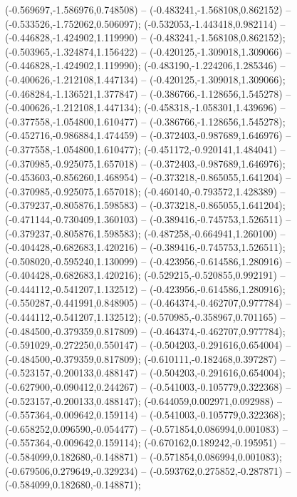  (-0.569697,-1.586976,0.748508) -- (-0.483241,-1.568108,0.862152) -- (-0.533526,-1.752062,0.506097);
 (-0.532053,-1.443418,0.982114) -- (-0.446828,-1.424902,1.119990) -- (-0.483241,-1.568108,0.862152);
 (-0.503965,-1.324874,1.156422) -- (-0.420125,-1.309018,1.309066) -- (-0.446828,-1.424902,1.119990);
 (-0.483190,-1.224206,1.285346) -- (-0.400626,-1.212108,1.447134) -- (-0.420125,-1.309018,1.309066);
 (-0.468284,-1.136521,1.377847) -- (-0.386766,-1.128656,1.545278) -- (-0.400626,-1.212108,1.447134);
 (-0.458318,-1.058301,1.439696) -- (-0.377558,-1.054800,1.610477) -- (-0.386766,-1.128656,1.545278);
 (-0.452716,-0.986884,1.474459) -- (-0.372403,-0.987689,1.646976) -- (-0.377558,-1.054800,1.610477);
 (-0.451172,-0.920141,1.484041) -- (-0.370985,-0.925075,1.657018) -- (-0.372403,-0.987689,1.646976);
 (-0.453603,-0.856260,1.468954) -- (-0.373218,-0.865055,1.641204) -- (-0.370985,-0.925075,1.657018);
 (-0.460140,-0.793572,1.428389) -- (-0.379237,-0.805876,1.598583) -- (-0.373218,-0.865055,1.641204);
 (-0.471144,-0.730409,1.360103) -- (-0.389416,-0.745753,1.526511) -- (-0.379237,-0.805876,1.598583);
 (-0.487258,-0.664941,1.260100) -- (-0.404428,-0.682683,1.420216) -- (-0.389416,-0.745753,1.526511);
 (-0.508020,-0.595240,1.130099) -- (-0.423956,-0.614586,1.280916) -- (-0.404428,-0.682683,1.420216);
 (-0.529215,-0.520855,0.992191) -- (-0.444112,-0.541207,1.132512) -- (-0.423956,-0.614586,1.280916);
 (-0.550287,-0.441991,0.848905) -- (-0.464374,-0.462707,0.977784) -- (-0.444112,-0.541207,1.132512);
 (-0.570985,-0.358967,0.701165) -- (-0.484500,-0.379359,0.817809) -- (-0.464374,-0.462707,0.977784);
 (-0.591029,-0.272250,0.550147) -- (-0.504203,-0.291616,0.654004) -- (-0.484500,-0.379359,0.817809);
 (-0.610111,-0.182468,0.397287) -- (-0.523157,-0.200133,0.488147) -- (-0.504203,-0.291616,0.654004);
 (-0.627900,-0.090412,0.244267) -- (-0.541003,-0.105779,0.322368) -- (-0.523157,-0.200133,0.488147);
 (-0.644059,0.002971,0.092988) -- (-0.557364,-0.009642,0.159114) -- (-0.541003,-0.105779,0.322368);
 (-0.658252,0.096590,-0.054477) -- (-0.571854,0.086994,0.001083) -- (-0.557364,-0.009642,0.159114);
 (-0.670162,0.189242,-0.195951) -- (-0.584099,0.182680,-0.148871) -- (-0.571854,0.086994,0.001083);
 (-0.679506,0.279649,-0.329234) -- (-0.593762,0.275852,-0.287871) -- (-0.584099,0.182680,-0.148871);
